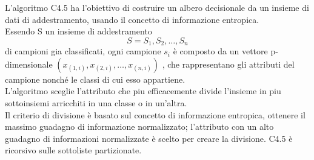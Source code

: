 \documentclass[../tesi.tex]{subfiles}
\begin{document}
L’algoritmo C4.5 ha l’obiettivo di costruire un  albero decisionale da un insieme di dati di addestramento, usando il concetto di informazione entropica.\\
Essendo S un insieme di addestramento $$ S = S_1 ,S_2,…,S_n$$  di campioni gia classificati, ogni campione $s_i$ è composto da un vettore p-dimensionale $(x_{(1,i)}  ,x_{(2,i)}, … , x_{(n,i)} )$ , che rappresentano gli attributi del campione nonché le classi di cui esso appartiene.\\
L’algoritmo sceglie l’attributo che piu efficacemente divide l’insieme in piu sottoinsiemi arricchiti in una classe o in un’altra.\\
Il criterio di divisione è basato sul concetto di informazione entropica, ottenere il massimo guadagno di informazione normalizzato; l’attributo con un alto guadagno di informazioni normalizzate è scelto per creare la divisione. C4.5 è ricorsivo sulle sottoliste partizionate.
\\
\end{document}

